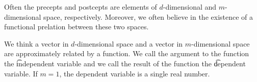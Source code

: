 

Often the precepts and postcepts are elements of $d$-dimensional and $m$-dimensional
space, respectively.
Moreover, we often believe in the existence
of a functional prelation between these
two spaces.


We think a vector in
$d$-dimensional space
and a vector in $m$-dimensional
space are approximately related
by a function.
We call the argument to the
function the \t{independent variable}
and we call the result
of the function the \t{dependent variable}.
If $m = 1$, the dependent variable
is a single real number.
